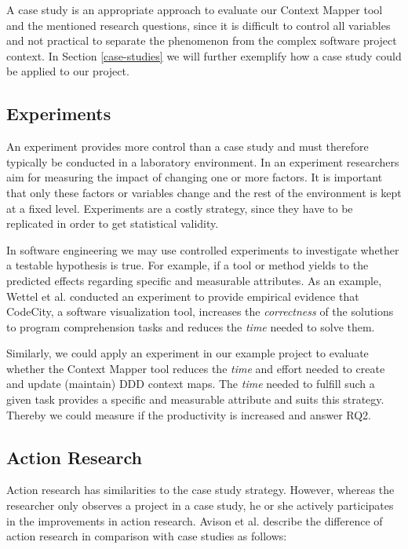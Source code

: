 \documentclass[runningheads]{llncs}
\begin{document}
A case study is an appropriate approach to evaluate our Context Mapper tool and the mentioned research questions, since it is difficult to control all variables and not practical to separate the phenomenon from the complex software project context. In Section \ref{case-studies} we will further exemplify how a case study could be applied to our project.

\subsection{Experiments}
An experiment provides more control than a case study and must therefore typically be conducted in a laboratory environment. In an experiment researchers aim for measuring the impact of changing one or more factors. It is important that only these factors or variables change and the rest of the environment is kept at a fixed level. Experiments are a costly strategy, since they have to be replicated in order to get statistical validity. 

In software engineering we may use controlled experiments to investigate whether a testable hypothesis is true. For example, if a tool or method yields to the predicted effects regarding specific and measurable attributes. As an example, Wettel et al. \cite{6032494} conducted an experiment to provide empirical evidence that CodeCity, a software visualization tool, increases the \textit{correctness} of the solutions to program comprehension tasks and reduces the \textit{time} needed to solve them.

Similarly, we could apply an experiment in our example project to evaluate whether the Context Mapper tool reduces the \textit{time} and effort needed to create and update (maintain) DDD context maps. The \textit{time} needed to fulfill such a given task provides a specific and measurable attribute and suits this strategy. Thereby we could measure if the productivity is increased and answer RQ2.

\subsection{Action Research}
Action research has similarities to the case study strategy. However, whereas the researcher only observes a project in a case study, he or she actively participates in the improvements in action research. Avison et al. \cite{Avison:1999:AR:291469.291479} describe the difference of action research in comparison with case studies as follows:
\end{document}
